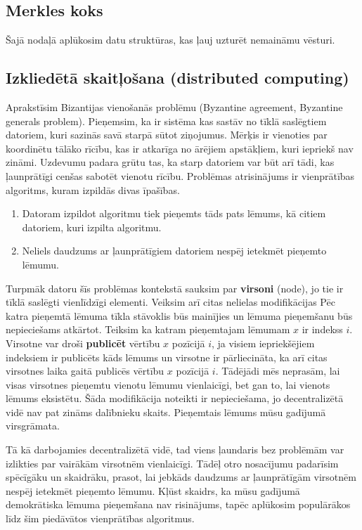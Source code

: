 \subsection{Merkles koks}
Šajā nodaļā aplūkosim datu struktūras, kas ļauj uzturēt nemaināmu vēsturi.

\subsection{Izkliedētā skaitļošana (distributed computing)}
Aprakstīsim Bizantijas vienošanās problēmu (Byzantine agreement, Byzantine generals problem).
Pieņemsim, ka ir sistēma kas sastāv no tīklā saslēgtiem datoriem, kuri sazinās savā starpā sūtot ziņojumus. Mērķis ir vienoties par koordinētu tālāko rīcību, kas ir atkarīga no ārējiem apstākļiem, kuri iepriekš nav zināmi. Uzdevumu padara grūtu tas, ka starp datoriem var būt arī tādi, kas ļaunprātīgi cenšas sabotēt vienotu rīcību.
Problēmas atrisinājums ir vienprātības algoritms, kuram izpildās divas īpašības.
\begin{enumerate}
    \item Datoram izpildot algoritmu tiek pieņemts tāds pats lēmums, kā citiem datoriem, kuri izpilta algoritmu.
    \item Neliels daudzums ar ļaunprātīgiem datoriem nespēj ietekmēt pieņemto lēmumu.
\end{enumerate}\cite{lamport82}
Turpmāk datoru šīs problēmas kontekstā sauksim par \textbf{virsoni} (node), jo tie ir tīklā saslēgti vienlīdzīgi elementi. Veiksim arī citas nelielas modifikācijas
Pēc katra pieņemtā lēmuma tīkla stāvoklis būs mainījies un lēmuma pieņemšanu būs nepieciešams atkārtot. Teiksim ka katram pieņemtajam lēmumam $x$ ir indekss $i$. Virsotne var droši \textbf{publicēt} vērtību $x$ pozīcijā $i$, ja visiem iepriekšējiem indeksiem ir publicēts kāds lēmums un virsotne ir pārliecināta, ka arī citas virsotnes laika gaitā publicēs vērtību $x$ pozīcijā $i$.\cite{mazieres15} Tādējādi mēs neprasām, lai visas virsotnes pieņemtu vienotu lēmumu vienlaicīgi, bet gan to, lai vienots lēmums eksistētu. Šāda modifikācija noteikti ir nepieciešama, jo decentralizētā vidē nav pat zināms dalībnieku skaits.
Pieņemtais lēmums mūsu gadījumā virsgrāmata.

Tā kā darbojamies decentralizētā vidē, tad viens ļaundaris bez problēmām var izlikties par vairākām virsotnēm vienlaicīgi. Tādēļ otro nosacījumu padarīsim spēcīgāku un skaidrāku, prasot, lai jebkāds daudzums ar ļaunprātīgām virsotnēm nespēj ietekmēt pieņemto lēmumu.
Kļūst skaidrs, ka mūsu gadījumā demokrātiska lēmuma pieņemšana nav risinājums, tapēc aplūkosim populārākos līdz šim piedāvātos vienprātības algoritmus.

